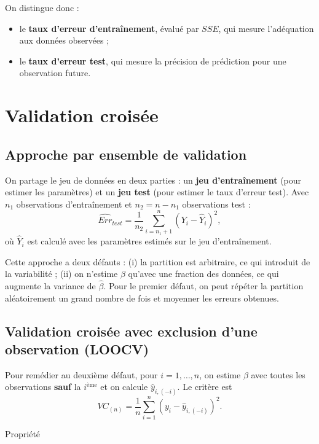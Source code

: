 \documentclass[
  french,
  letterpaper,
  DIV=11,
  numbers=noendperiod]{scrreprt}
\begin{document}
On distingue donc :

\begin{itemize}
\item
  le \textbf{taux d'erreur d'entraînement}, évalué par \(SSE\), qui
  mesure l'adéquation aux données observées ;
\item
  le \textbf{taux d'erreur test}, qui mesure la précision de prédiction
  pour une observation future.
\end{itemize}

\section{Validation croisée}\label{validation-croisuxe9e}

\subsection{Approche par ensemble de
validation}\label{approche-par-ensemble-de-validation}

On partage le jeu de données en deux parties : un \textbf{jeu
d'entraînement} (pour estimer les paramètres) et un \textbf{jeu test}
(pour estimer le taux d'erreur test). Avec \(n_1\) observations
d'entraînement et \(n_2 = n - n_1\) observations test :
\[\widehat{Err}_{test} = \frac{1}{n_2}\sum_{i = n_1+1}^{n}(Y_i - \hat Y_i)^2,\]
où \(\hat Y_i\) est calculé avec les paramètres estimés sur le jeu
d'entraînement.

Cette approche a deux défauts : (i) la partition est arbitraire, ce qui
introduit de la variabilité ; (ii) on n'estime \(\beta\) qu'avec une
fraction des données, ce qui augmente la variance de \(\hat\beta\). Pour
le premier défaut, on peut répéter la partition aléatoirement un grand
nombre de fois et moyenner les erreurs obtenues.

\subsection{Validation croisée avec exclusion d'une observation
(LOOCV)}\label{validation-croisuxe9e-avec-exclusion-dune-observation-loocv}

Pour remédier au deuxième défaut, pour \(i = 1,\ldots,n\), on estime
\(\beta\) avec toutes les observations \textbf{sauf} la
\(i^{\text{ème}}\) et on calcule \(\hat y_{i,(-i)}\). Le critère est
\[VC_{(n)} = \frac{1}{n}\sum_{i=1}^n\left(y_i - \hat y_{i,(-i)}\right)^2.\]

{Propriété}
\end{document}
